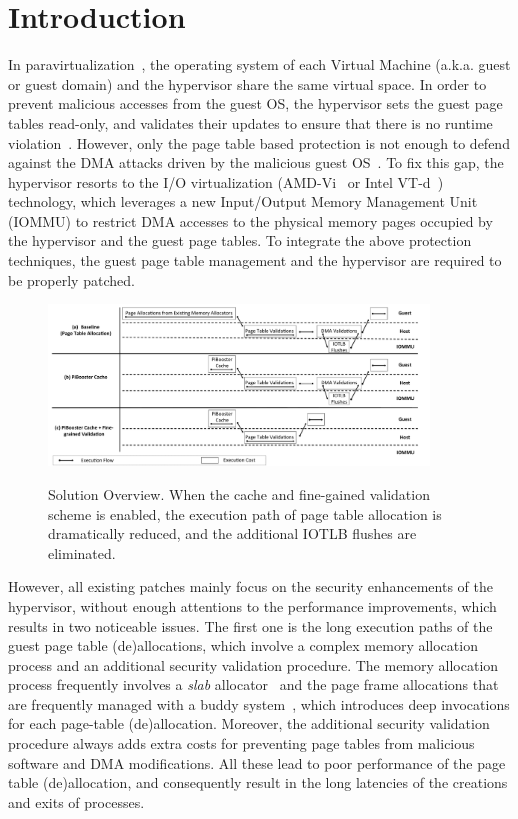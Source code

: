 \section{Introduction} \label{sec:intro}
In paravirtualization~\cite{XEN-SOSP03,whitaker2002scale}, the operating system of each Virtual Machine (a.k.a. guest or guest domain) and the hypervisor share the same virtual space.
In order to prevent malicious accesses from the guest OS, the hypervisor sets the guest page tables read-only, and validates their updates to ensure that there is no runtime violation~\cite{XEN-SOSP03}.
However, only the page table based protection is not enough to defend against the DMA attacks driven by the malicious guest OS~\cite{disaggregation}.
To fix this gap, the hypervisor resorts to the I/O virtualization (AMD-Vi~\cite{amdvt} or Intel VT-d~\cite{intelvt}) technology, which leverages a new Input/Output Memory Management Unit (IOMMU) to restrict DMA accesses to the physical memory pages occupied by the hypervisor and the guest page tables.
To integrate the above protection techniques, the guest page table management and the hypervisor are required to be properly patched.

\begin{figure}[ht]
\centering
\includegraphics[width=0.9\textwidth]{image/overview/overview.pdf} \\
\caption{Solution Overview. When the \name cache and fine-gained validation scheme is enabled,
the execution path of page table allocation is dramatically reduced, and the additional IOTLB flushes are eliminated.}
\label{fig:overview}
\end{figure}

However, all existing patches mainly focus on the security enhancements of the hypervisor, without enough attentions to the performance improvements, which results in two noticeable issues.
The first one is the long execution paths of the guest page table (de)allocations, which involve a complex memory allocation process and an additional security validation procedure.
The memory allocation process frequently involves a \emph{slab} allocator~\cite{slaballocator} and the page frame allocations that are frequently managed with a buddy system~\cite{buddyallocator}, which introduces deep invocations for each page-table (de)allocation.
Moreover, the additional security validation procedure always adds extra costs for preventing page tables from malicious software and DMA modifications.
All these lead to poor performance of the page table (de)allocation, and consequently result in the long latencies of the creations and exits of processes.

